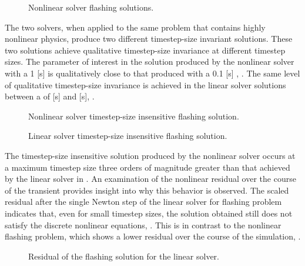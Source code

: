 \begin{figure}[h!tb]
\centering

\caption{Nonlinear solver flashing solutions.}
\label{fig:flashingAlphaNln}
\end{figure}

The two solvers, when applied to the same problem that contains highly nonlinear physics, produce two different timestep-size invariant solutions.
These two solutions achieve qualitative timestep-size invariance at different timestep sizes.
The parameter of interest in the solution produced by the nonlinear solver with a 1 [s] \dtmax{} is qualitatively close to that produced with a 0.1 [s] \dtmax{}, .
The same level of qualitative timestep-size invariance is achieved in the linear solver solutions between a \dtmax{} of  [s] and  [s], .

\begin{figure}[h!tb]
\centering

\caption{Nonlinear solver timestep-size insensitive flashing solution.}
\label{fig:flashingDtInsensitiveNln}
\end{figure}

\begin{figure}[h!tb]
\centering

\caption{Linear solver timestep-size insensitive flashing solution.}
\label{fig:flashingDtInsensitiveLin}
\end{figure}

The timestep-size insensitive solution produced by the nonlinear solver occurs at a maximum timestep size three orders of magnitude greater than that achieved by the linear solver in \cobra{}.
An examination of the nonlinear residual over the course of the transient provides insight into why this behavior is observed.
The scaled residual after the single Newton step of the linear solver for flashing problem indicates that, even for small timestep sizes, the solution obtained still does not satisfy the discrete nonlinear equations, .
This is in contrast to the nonlinear flashing problem, which shows a lower residual over the course of the simulation, .

\begin{figure}[h!tb]
\centering

\caption{Residual of the flashing solution for the linear solver.}
\label{fig:flashingResidualLin}
\end{figure}


